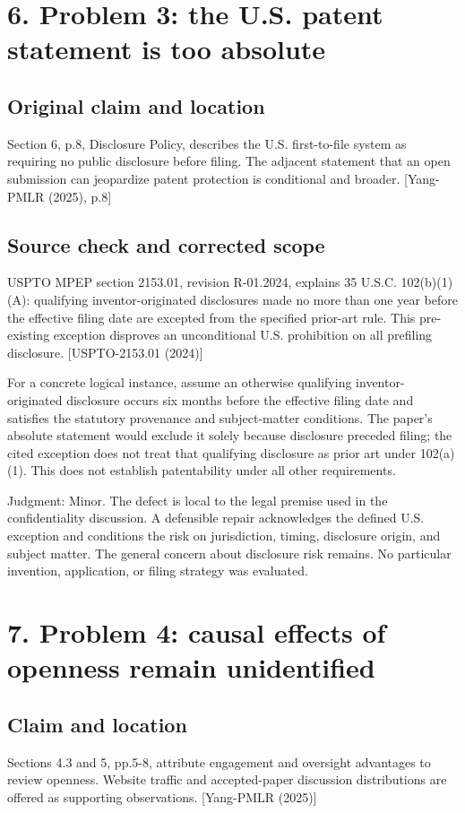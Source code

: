 \documentclass[10pt]{article}
\begin{document}
\section*{6. Problem 3: the U.S. patent statement is too absolute}
\subsection*{Original claim and location}
Section 6, p.8, Disclosure Policy, describes the U.S. first-to-file system as requiring no public disclosure before filing. The adjacent statement that an open submission can jeopardize patent protection is conditional and broader. [Yang-PMLR (2025), p.8]\par
\subsection*{Source check and corrected scope}
USPTO MPEP section 2153.01, revision R-01.2024, explains 35 U.S.C. 102(b)(1)(A): qualifying inventor-originated disclosures made no more than one year before the effective filing date are excepted from the specified prior-art rule. This pre-existing exception disproves an unconditional U.S. prohibition on all prefiling disclosure. [USPTO-2153.01 (2024)]\par
For a concrete logical instance, assume an otherwise qualifying inventor-originated disclosure occurs six months before the effective filing date and satisfies the statutory provenance and subject-matter conditions. The paper’s absolute statement would exclude it solely because disclosure preceded filing; the cited exception does not treat that qualifying disclosure as prior art under 102(a)(1). This does not establish patentability under all other requirements.\par
Judgment: Minor. The defect is local to the legal premise used in the confidentiality discussion. A defensible repair acknowledges the defined U.S. exception and conditions the risk on jurisdiction, timing, disclosure origin, and subject matter. The general concern about disclosure risk remains. No particular invention, application, or filing strategy was evaluated.\par
\section*{7. Problem 4: causal effects of openness remain unidentified}
\subsection*{Claim and location}
Sections 4.3 and 5, pp.5-8, attribute engagement and oversight advantages to review openness. Website traffic and accepted-paper discussion distributions are offered as supporting observations. [Yang-PMLR (2025)]\par
\end{document}
